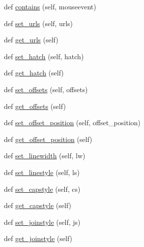 \begin{DoxyCompactItemize}
\item 
def \hyperlink{classmatplotlib_1_1collections_1_1Collection_a1b48cbe72f400a5e4e9749eeb04c6959}{contains} (self, mouseevent)
\item 
def \hyperlink{classmatplotlib_1_1collections_1_1Collection_a290d83571169ec4b2781cf0863afa54c}{set\+\_\+urls} (self, urls)
\item 
def \hyperlink{classmatplotlib_1_1collections_1_1Collection_a59724cc38a0ede3a46dfdb19cbdbb917}{get\+\_\+urls} (self)
\item 
def \hyperlink{classmatplotlib_1_1collections_1_1Collection_aace5f58c977e2ece4efb233693e12614}{set\+\_\+hatch} (self, hatch)
\item 
def \hyperlink{classmatplotlib_1_1collections_1_1Collection_ad4c4082a2c1b1e1df691541f3b746ca9}{get\+\_\+hatch} (self)
\item 
def \hyperlink{classmatplotlib_1_1collections_1_1Collection_ac88ffe0504f0b580f20d4adb7f324977}{set\+\_\+offsets} (self, offsets)
\item 
def \hyperlink{classmatplotlib_1_1collections_1_1Collection_a474bed71ee887c0f222e46eec0c62106}{get\+\_\+offsets} (self)
\item 
def \hyperlink{classmatplotlib_1_1collections_1_1Collection_a832e5bad2036b7887b08fe544e213836}{set\+\_\+offset\+\_\+position} (self, offset\+\_\+position)
\item 
def \hyperlink{classmatplotlib_1_1collections_1_1Collection_af65906d34d301b0f4813a59806148243}{get\+\_\+offset\+\_\+position} (self)
\item 
def \hyperlink{classmatplotlib_1_1collections_1_1Collection_a44e7fd7155a2b44c97964f8004f8fbbe}{set\+\_\+linewidth} (self, lw)
\item 
def \hyperlink{classmatplotlib_1_1collections_1_1Collection_a852cedf2da8db5b1e0048f78de61b90c}{set\+\_\+linestyle} (self, ls)
\item 
def \hyperlink{classmatplotlib_1_1collections_1_1Collection_ad0a6677dac2573501580150f22c8d12d}{set\+\_\+capstyle} (self, cs)
\item 
def \hyperlink{classmatplotlib_1_1collections_1_1Collection_acd6b5ab471e40236bda29b8924918773}{get\+\_\+capstyle} (self)
\item 
def \hyperlink{classmatplotlib_1_1collections_1_1Collection_a9593b9910e5abcf7be47ed7909039518}{set\+\_\+joinstyle} (self, js)
\item 
def \hyperlink{classmatplotlib_1_1collections_1_1Collection_a6dc1d55da41231fe21a987301147bbc5}{get\+\_\+joinstyle} (self)
\item 

\end{DoxyCompactItemize}
